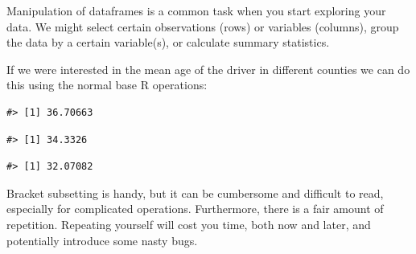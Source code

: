 \documentclass[]{book}
\newenvironment{Shaded}{\begin{snugshade}}{\end{snugshade}}
\newcommand{\KeywordTok}[1]{\textcolor[rgb]{0.13,0.29,0.53}{\textbf{#1}}}
\newcommand{\DataTypeTok}[1]{\textcolor[rgb]{0.13,0.29,0.53}{#1}}
\newcommand{\StringTok}[1]{\textcolor[rgb]{0.31,0.60,0.02}{#1}}
\newcommand{\OtherTok}[1]{\textcolor[rgb]{0.56,0.35,0.01}{#1}}
\newcommand{\OperatorTok}[1]{\textcolor[rgb]{0.81,0.36,0.00}{\textbf{#1}}}
\newcommand{\NormalTok}[1]{#1}
\theoremstyle{definition}
\theoremstyle{definition}
\theoremstyle{definition}
\theoremstyle{remark}
\begin{document}
Manipulation of dataframes is a common task when you start exploring
your data. We might select certain observations (rows) or variables
(columns), group the data by a certain variable(s), or calculate summary
statistics.

If we were interested in the mean age of the driver in different
counties we can do this using the normal base R operations:

\begin{Shaded}
\end{Shaded}

\begin{verbatim}
#> [1] 36.70663
\end{verbatim}

\begin{Shaded}
\end{Shaded}

\begin{verbatim}
#> [1] 34.3326
\end{verbatim}

\begin{Shaded}
\end{Shaded}

\begin{verbatim}
#> [1] 32.07082
\end{verbatim}

Bracket subsetting is handy, but it can be cumbersome and difficult to
read, especially for complicated operations. Furthermore, there is a
fair amount of repetition. Repeating yourself will cost you time, both
now and later, and potentially introduce some nasty bugs.
\end{document}
